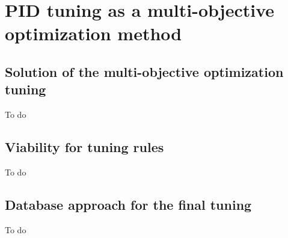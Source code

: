 \chapter{PID tuning as a multi-objective optimization method}
\label{chap:PIDMOOP}

\section{Solution of the multi-objective optimization tuning}
\label{sec:SolMOOP}
To do
%
\section{Viability for tuning rules}
\label{sec:TuningRulesMOOP}
To do
%
\section{Database approach for the final tuning}
\label{sec:DatabaseMOOP}
To do
%
